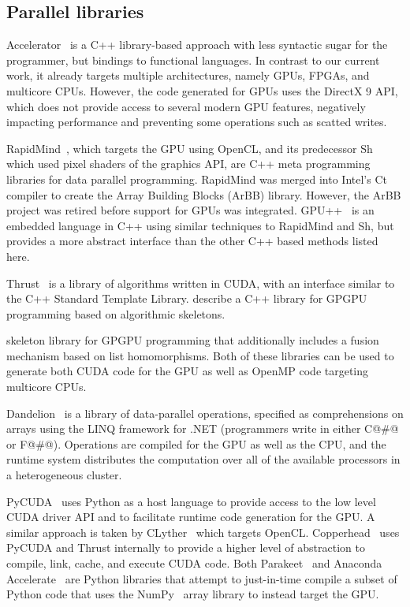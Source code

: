 \subsection{Parallel libraries}


Accelerator~\cite{Bond:2010bd,Tarditi:2006} is a C++ library-based approach with
less syntactic sugar for the programmer, but bindings to functional languages.
In contrast to our current work, it already targets multiple architectures,
namely GPUs, FPGAs, and multicore CPUs. However, the code generated for GPUs
uses the DirectX 9 API, which does not provide access to several modern GPU
features, negatively impacting performance and preventing some operations such
as scatted writes.

RapidMind~\cite{LinXu:2008ig}, which targets the GPU using OpenCL, and its
predecessor Sh~\cite{McCool:2004,McCool:2004un} which used pixel shaders of the
graphics API, are C++ meta programming libraries for data parallel programming.
RapidMind was merged into Intel's Ct compiler to create the Array Building
Blocks (ArBB) library. However, the ArBB project was retired before support for
GPUs was integrated. GPU++~\cite{Jansen:2008vw} is an embedded language in C++
using similar techniques to RapidMind and Sh, but provides a more abstract
interface than the other C++ based methods listed here.

Thrust~\cite{ThrustAParallelT:ub} is a library of algorithms written in CUDA,
with an interface similar to the C++ Standard Template Library.
\citet{Sato:2009cq} describe a C++ library for GPGPU programming based on
algorithmic skeletons.


skeleton library for GPGPU programming that
additionally includes a fusion mechanism based on list homomorphisms. Both of
these libraries can be used to generate both CUDA code for the GPU as well as
OpenMP code targeting multicore CPUs.



Dandelion~\cite{Rossbach:2013bj} is a library of data-parallel operations,
specified as comprehensions on arrays using the LINQ framework for .NET
(programmers write in either C@#@ or F@#@). Operations are compiled for the GPU
as well as the CPU, and the runtime system distributes the computation over all
of the available processors in a heterogeneous cluster.


PyCUDA~\cite{Klockner:2012tj} uses Python as a host language to provide access
to the low level CUDA driver API and to facilitate runtime code generation for
the GPU. A similar approach is taken by CLyther~\cite{CLyther:EvXSiruK} which
targets OpenCL. Copperhead~\cite{Catanzaro:2011cn} uses PyCUDA and Thrust
internally to provide a higher level of abstraction to compile, link, cache, and
execute CUDA code. Both Parakeet~\cite{Rubinsteyn:2012ve} and Anaconda
Accelerate~\cite{AnacondaAccelerate:2013vn} are Python libraries that attempt to
just-in-time compile a subset of Python code that uses the
NumPy~\cite{NumPy:2006uq} array library to instead target the GPU.

